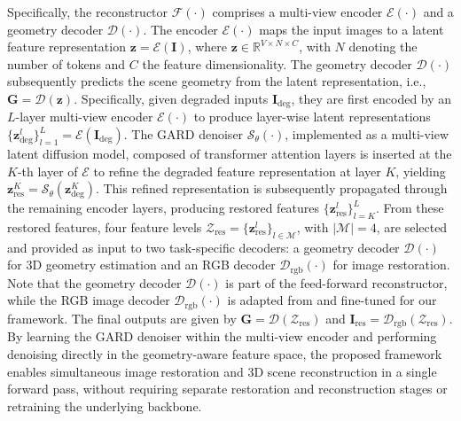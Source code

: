 Specifically, the reconstructor $\mathcal{F}(\cdot)$ comprises a multi-view encoder $\mathcal{E}(\cdot)$ and a geometry decoder $\mathcal{D}(\cdot)$. The encoder $\mathcal{E}(\cdot)$ maps the input images to a latent feature representation $\mathbf{z} = \mathcal{E}(\mathbf{I})$, where $\mathbf{z} \in \mathbb{R}^{V \times N \times C}$, with $N$ denoting the number of tokens and $C$ the feature dimensionality. The geometry decoder $\mathcal{D}(\cdot)$ subsequently predicts the scene geometry from the latent representation, i.e., $\mathbf{G} = \mathcal{D}(\mathbf{z})$. Specifically, given degraded inputs $\mathbf{I}_{\text{deg}}$, they are first encoded by an $L$-layer multi-view encoder $\mathcal{E}(\cdot)$ to produce layer-wise latent representations $\{\mathbf{z}_{\text{deg}}^{l}\}_{l=1}^{L} = \mathcal{E}(\mathbf{I}_{\text{deg}})$. The GARD denoiser $\mathcal{S}_{\theta}(\cdot)$, implemented as a multi-view latent diffusion model, composed of transformer attention layers is inserted at the $K$-th layer of $\mathcal{E}$ to refine the degraded feature representation at layer $K$, yielding $\mathbf{z}_{\text{res}}^{K} = \mathcal{S}_{\theta}(\mathbf{z}_{\text{deg}}^{K})$. This refined representation is subsequently propagated through the remaining encoder layers, producing restored features $\{\mathbf{z}_{\text{res}}^{l}\}_{l=K}^{L}$. From these restored features, four feature levels $\mathcal{Z}_{\text{res}} = \{\mathbf{z}_{\text{res}}^{l}\}_{l \in \mathcal{M}}$, with $|\mathcal{M}| = 4$, are selected and provided as input to two task-specific decoders: a geometry decoder $\mathcal{D}(\cdot)$ for 3D geometry estimation and an RGB decoder $\mathcal{D}_{\text{rgb}}(\cdot)$ for image restoration. Note that the geometry decoder $\mathcal{D}(\cdot)$ is part of the feed-forward reconstructor, while the RGB image decoder $\mathcal{D}_{\text{rgb}}(\cdot)$ is adapted from \cite{jang2026gld} and fine-tuned for our framework. The final outputs are given by $\mathbf{G} = \mathcal{D}(\mathcal{Z}_{\text{res}})$ and $\mathbf{I}_{\text{res}} = \mathcal{D}_{\text{rgb}}(\mathcal{Z}_{\text{res}})$. By learning the GARD denoiser within the multi-view encoder and performing denoising directly in the geometry-aware feature space, the proposed framework enables simultaneous image restoration and 3D scene reconstruction in a single forward pass, without requiring separate restoration and reconstruction stages or retraining the underlying backbone.



